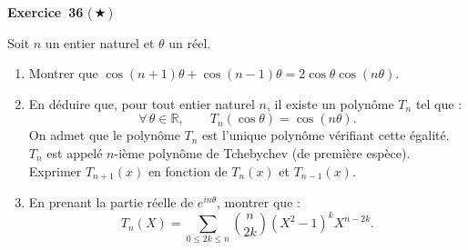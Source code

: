 \documentclass[11pt,a4paper]{article}
\begin{document}
	\medskip\noindent\textbf{\Large\color{bleu}Exercice~36} \textnormal{(\,$\bigstar$\,)}\nopagebreak
	\begin{enonce}
		Soit $n$ un entier naturel et $\theta$ un réel.
		\begin{enumerate}
			\item Montrer que $\cos(n+1)\theta+\cos(n-1)\theta=2\cos\theta\cos(n\theta)$.
			
			\item En déduire que, pour tout entier naturel $n$, il existe un polynôme $T_n$ tel que :
			\[
			\forall\,\theta\in\mathbb{R},\qquad T_n(\cos\theta)=\cos(n\theta).
			\]
			On admet que le polynôme $T_n$ est l'unique polynôme vérifiant cette égalité. $T_n$ est appelé $n$-ième polynôme de Tchebychev (de première espèce). Exprimer $T_{n+1}(x)$ en fonction de $T_n(x)$ et $T_{n-1}(x)$.
			
			\item En prenant la partie réelle de $e^{in\theta}$, montrer que :
			\[
			T_n(X)=\sum_{0\le 2k\le n}\binom{n}{2k}\left(X^2-1\right)^k X^{n-2k}.
			\]
		\end{enumerate}
	\end{enonce}
\end{document}
